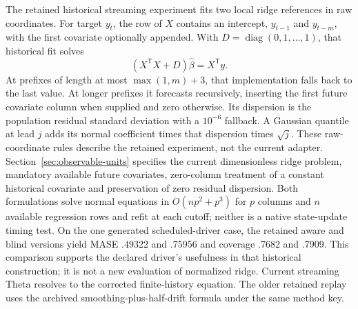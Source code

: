 The retained historical streaming experiment fits two local ridge references in raw coordinates. For target $y_t$, the row of $X$ contains an intercept, $y_{t-1}$ and $y_{t-m}$, with the first covariate optionally appended. With $D=\operatorname{diag}(0,1,\ldots,1)$, that historical fit solves
\begin{equation}
 (X^\mathsf{T}X+D)\widehat\beta=X^\mathsf{T}y .
\end{equation}
At prefixes of length at most $\max(1,m)+3$, that implementation falls back to the last value. At longer prefixes it forecasts recursively, inserting the first future covariate column when supplied and zero otherwise. Its dispersion is the population residual standard deviation with a $10^{-6}$ fallback. A Gaussian quantile at lead $j$ adds its normal coefficient times that dispersion times $\sqrt{j}$. These raw-coordinate rules describe the retained experiment, not the current adapter. Section~\ref{sec:observable-units} specifies the current dimensionless ridge problem, mandatory available future covariates, zero-column treatment of a constant historical covariate and preservation of zero residual dispersion. Both formulations solve normal equations in $O(np^2+p^3)$ for $p$ columns and $n$ available regression rows and refit at each cutoff; neither is a native state-update timing test. On the one generated scheduled-driver case, the retained aware and blind versions yield MASE .49322 and .75956 and coverage .7682 and .7909. This comparison supports the declared driver's usefulness in that historical construction; it is not a new evaluation of normalized ridge. Current streaming Theta resolves to the corrected finite-history equation. The older retained replay uses the archived smoothing-plus-half-drift formula under the same method key.

